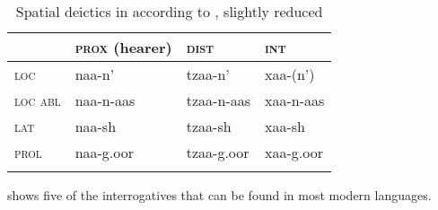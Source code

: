 \begin{table}
\caption{Spatial deictics in  according to \citet[131]{Janhunen2012c}, slightly reduced}
\label{tab:mong:15}

\begin{tabularx}{\textwidth}{XXXl}
\lsptoprule
& \textbf{\textsc{prox} (hearer)} & \textbf{\textsc{dist}} & \textbf{\textsc{int}}\\
\midrule
\textsc{loc} & naa-n’ & tzaa-n’ & xaa-(n’)\\
\textsc{loc abl} & naa-n-aas & tzaa-n-aas & xaa-n-aas\\
\textsc{lat} & naa-sh & tzaa-sh & xaa-sh\\
\textsc{prol} & naa-g.oor & tzaa-g.oor & xaa-g.oor\\
\lspbottomrule
\end{tabularx}
\end{table}

 shows five of the interrogatives that can be found in most modern  languages.

